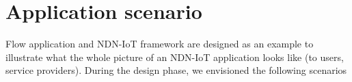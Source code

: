 \section{Application scenario}
\label{sec:scenarios}

Flow application and NDN-IoT framework are designed as an example to illustrate what the whole picture of an NDN-IoT application looks like (to users, service providers).
During the design phase, we envisioned the following scenarios

